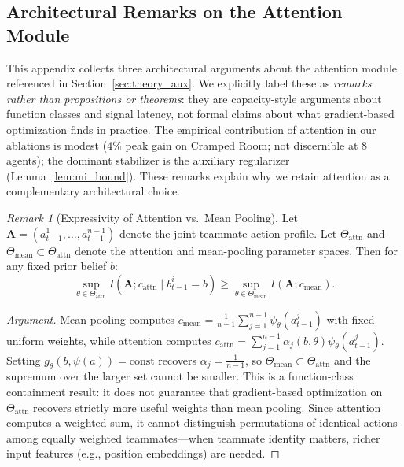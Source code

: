 \documentclass{article}
\theoremstyle{plain}
\theoremstyle{definition}
\theoremstyle{remark}
\newtheorem{remark}[theorem]{Remark}
\begin{document}
\subsection{Architectural Remarks on the Attention Module}
\label{app:proofs}

This appendix collects three architectural arguments about the attention module referenced in Section~\ref{sec:theory_aux}. We explicitly label these as \emph{remarks rather than propositions or theorems}: they are capacity-style arguments about function classes and signal latency, not formal claims about what gradient-based optimization finds in practice. The empirical contribution of attention in our ablations is modest (4\% peak gain on Cramped Room; not discernible at 8 agents); the dominant stabilizer is the auxiliary regularizer (Lemma~\ref{lem:mi_bound}). These remarks explain why we retain attention as a complementary architectural choice.

\begin{remark}[Expressivity of Attention vs.\ Mean Pooling]
\label{rem:expressivity}
Let $\mathbf{A} = (a_{t-1}^1, \ldots, a_{t-1}^{n-1})$ denote the joint teammate action profile. Let $\Theta_{\mathrm{attn}}$ and $\Theta_{\mathrm{mean}} \subset \Theta_{\mathrm{attn}}$ denote the attention and mean-pooling parameter spaces. Then for any fixed prior belief $b$:
\[
\sup_{\theta \in \Theta_{\mathrm{attn}}} I(\mathbf{A}; c_{\mathrm{attn}} \mid b_{t-1}^i = b) \geq \sup_{\theta \in \Theta_{\mathrm{mean}}} I(\mathbf{A}; c_{\mathrm{mean}}).
\]
\end{remark}

\begin{proof}[Argument]
Mean pooling computes $c_{\mathrm{mean}} = \frac{1}{n-1}\sum_{j=1}^{n-1} \psi_\theta(a_{t-1}^j)$ with fixed uniform weights, while attention computes $c_{\mathrm{attn}} = \sum_{j=1}^{n-1} \alpha_j(b, \theta) \psi_\theta(a_{t-1}^j)$. Setting $g_\theta(b, \psi(a)) = \text{const}$ recovers $\alpha_j = \frac{1}{n-1}$, so $\Theta_{\mathrm{mean}} \subset \Theta_{\mathrm{attn}}$ and the supremum over the larger set cannot be smaller. This is a function-class containment result: it does not guarantee that gradient-based optimization on $\Theta_{\mathrm{attn}}$ recovers strictly more useful weights than mean pooling. Since attention computes a weighted sum, it cannot distinguish permutations of identical actions among equally weighted teammates---when teammate identity matters, richer input features (e.g., position embeddings) are needed.
\end{proof}
\end{document}
